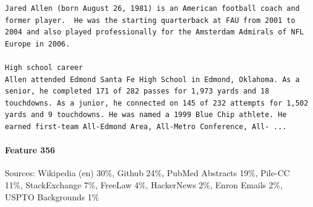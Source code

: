 \begin{verbatim}
Jared Allen (born August 26, 1981) is an American football coach and former player.  He was the starting quarterback at FAU from 2001 to 2004 and also played professionally for the Amsterdam Admirals of NFL Europe in 2006.

High school career 
Allen attended Edmond Santa Fe High School in Edmond, Oklahoma. As a senior, he completed 171 of 282 passes for 1,973 yards and 18 touchdowns. As a junior, he connected on 145 of 232 attempts for 1,502 yards and 9 touchdowns. He was named a 1999 Blue Chip athlete. He earned first-team All-Edmond Area, All-Metro Conference, All- ...

\end{verbatim}

\paragraph*{Feature 356} Sources: Wikipedia (en) 30\%, Github 24\%, PubMed Abstracts 19\%, Pile-CC 11\%, StackExchange 7\%, FreeLaw 4\%, HackerNews 2\%, Enron Emails 2\%, USPTO Backgrounds 1\%

